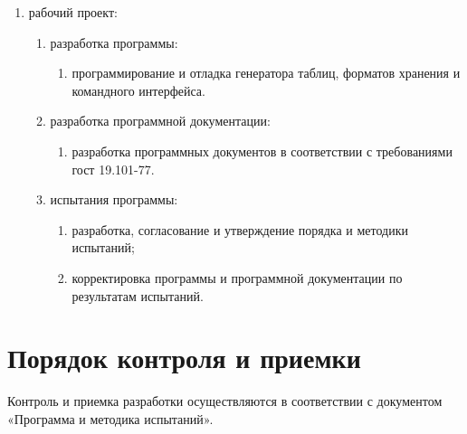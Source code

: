 \documentclass{../TechDoc}
\begin{document}
\begin{enumerate}
\begin{enumerate}
\begin{enumerate}
            \item разработка структуры генерационного фреймворка, слоя хранения и командного интерфейса; 
            \item окончательное определение конфигурации технических средств. 
        \end{enumerate}
        \item утверждение технического проекта:
        \begin{enumerate}
            \item разработка отчета; 
            \item согласование и утверждение технического проекта. 
        \end{enumerate}
    \end{enumerate}
    \item рабочий проект:
    \begin{enumerate}
        \item разработка программы:
        \begin{enumerate}
            \item программирование и отладка генератора таблиц, форматов хранения и командного интерфейса. 
        \end{enumerate}
        \item разработка программной документации:
        \begin{enumerate}
            \item разработка программных документов в соответствии с требованиями гост 19.101-77. 
        \end{enumerate}
        \item испытания программы:
        \begin{enumerate}
            \item разработка, согласование и утверждение порядка и методики испытаний; 
            \item корректировка программы и программной документации по результатам испытаний.
        \end{enumerate}
    \end{enumerate}
    \end{enumerate}

    \section{Порядок контроля и приемки}
    
    Контроль и приемка разработки осуществляются в соответствии с документом «Программа и методика испытаний».
\end{document}
